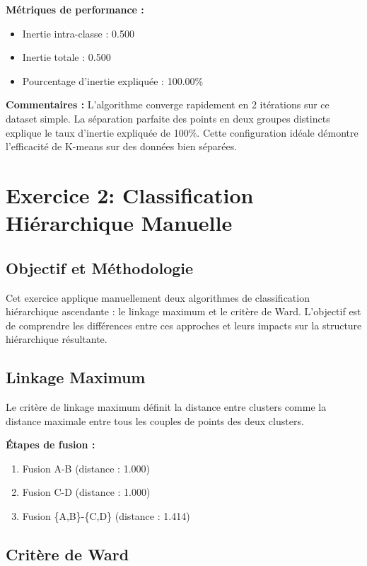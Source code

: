 \documentclass[12pt,a4paper]{article}
\begin{document}
\textbf{Métriques de performance :}
\begin{itemize}
    \item Inertie intra-classe : 0.500
    \item Inertie totale : 0.500
    \item Pourcentage d'inertie expliquée : 100.00\%
\end{itemize}

\textbf{Commentaires :} L'algorithme converge rapidement en 2 itérations sur ce dataset simple. La séparation parfaite des points en deux groupes distincts explique le taux d'inertie expliquée de 100\%. Cette configuration idéale démontre l'efficacité de K-means sur des données bien séparées.

\section{Exercice 2: Classification Hiérarchique Manuelle}

\subsection{Objectif et Méthodologie}

Cet exercice applique manuellement deux algorithmes de classification hiérarchique ascendante : le linkage maximum et le critère de Ward. L'objectif est de comprendre les différences entre ces approches et leurs impacts sur la structure hiérarchique résultante.

\subsection{Linkage Maximum}

Le critère de linkage maximum définit la distance entre clusters comme la distance maximale entre tous les couples de points des deux clusters.

\textbf{Étapes de fusion :}
\begin{enumerate}
    \item Fusion A-B (distance : 1.000)
    \item Fusion C-D (distance : 1.000)
    \item Fusion \{A,B\}-\{C,D\} (distance : 1.414)
\end{enumerate}

\subsection{Critère de Ward}
\end{document}
